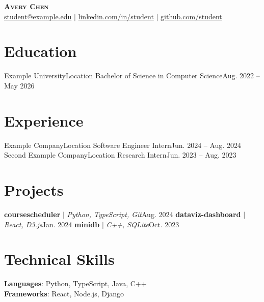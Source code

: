 \documentclass[letterpaper,11pt]{article}
\begin{document}
\begin{center}
    \textbf{\Huge \scshape Avery Chen} \\ \small
    \href{mailto:student@example.edu}{student@example.edu} $|$ 
    \href{https://linkedin.com/in/student}{linkedin.com/in/student} $|$
    \href{https://github.com/student}{github.com/student}
\end{center}

\section{Education}
  \resumeSubHeadingListStart
    \resumeSubheading
      {Example University}{Location}
      {Bachelor of Science in Computer Science}{Aug. 2022 -- May 2026}
  \resumeSubHeadingListEnd

\section{Experience}
  \resumeSubHeadingListStart
    \resumeSubheading
      {Example Company}{Location}
      {Software Engineer Intern}{Jun. 2024 -- Aug. 2024}
      \resumeItemListStart
      \resumeItemListEnd
    \resumeSubheading
      {Second Example Company}{Location}
      {Research Intern}{Jun. 2023 -- Aug. 2023}
      \resumeItemListStart
      \resumeItemListEnd
  \resumeSubHeadingListEnd

\section{Projects}
  \resumeSubHeadingListStart
    \resumeProjectHeading
      {\textbf{coursescheduler} $|$ \emph{Python, TypeScript, Git}}{Aug. 2024}
      \resumeItemListStart
      \resumeItemListEnd
    \resumeProjectHeading
      {\textbf{dataviz-dashboard} $|$ \emph{React, D3.js}}{Jan. 2024}
      \resumeItemListStart
      \resumeItemListEnd
    \resumeProjectHeading
      {\textbf{minidb} $|$ \emph{C++, SQLite}}{Oct. 2023}
      \resumeItemListStart
      \resumeItemListEnd
  \resumeSubHeadingListEnd

\section{Technical Skills}
 \begin{itemize}[leftmargin=0.15in, label={}]
    \small{\item{
     \textbf{Languages}{: Python, TypeScript, Java, C++} \\
     \textbf{Frameworks}{: React, Node.js, Django}
    }}
 \end{itemize}
\end{document}
